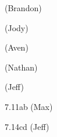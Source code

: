\documentclass[minion]{homework}
\begin{document}
\begin{aproblems}


 (Brandon)

 (Jody)

 (Aven)

 (Nathan)

 (Jeff)

\hproblem 7.11ab (Max)

\hproblem 7.14cd (Jeff)

\end{aproblems}
\end{document}
